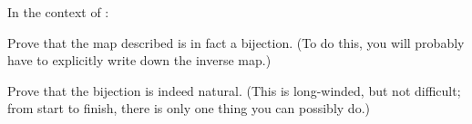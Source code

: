 \begin{problem}
	In the context of :
	\begin{enumerate}[(a)]
	\ii Prove that the map described is in fact a bijection.
	(To do this, you will probably have to explicitly write down the inverse map.)

	\ii \yod Prove that the bijection is indeed natural.
	(This is long-winded, but not difficult; from start to finish,
	there is only one thing you can possibly do.)
	\end{enumerate}
\end{problem}

